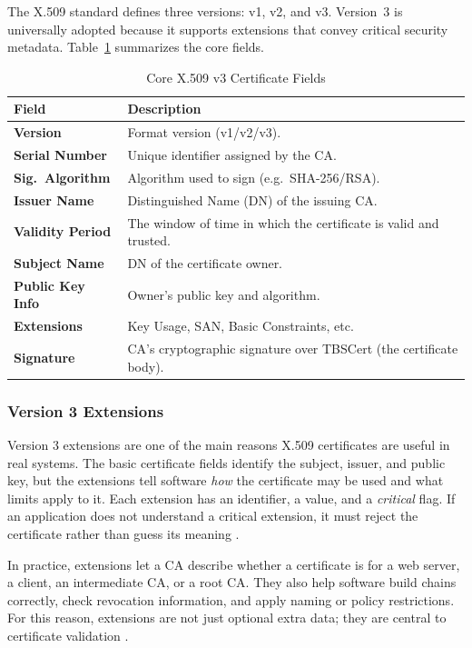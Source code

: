 \documentclass[10pt,twocolumn]{article}
\begin{document}
The X.509 standard defines three versions: v1, v2, and v3. Version~3 is
universally adopted because it supports extensions that convey critical
security metadata. Table~\ref{tab:cert-fields} summarizes the core fields.

\begin{table}[h]
\centering
\caption{Core X.509 v3 Certificate Fields}
\label{tab:cert-fields}
\renewcommand{\arraystretch}{1.2}
\begin{tabularx}{\columnwidth}{>{\bfseries\footnotesize}p{2.1cm}
                                >{\footnotesize}X}
\toprule
Field & Description \\
\midrule
Version        & Format version (v1/v2/v3). \\
Serial Number  & Unique identifier assigned by the CA. \\
Sig.\ Algorithm& Algorithm used to sign (e.g.\ SHA-256/RSA). \\
Issuer Name    & Distinguished Name (DN) of the issuing CA. \\
Validity Period& The window of time in which the certificate is valid and trusted. \\
Subject Name   & DN of the certificate owner. \\
Public Key Info& Owner's public key and algorithm. \\
Extensions     & Key Usage, SAN, Basic Constraints, etc. \\
Signature      & CA's cryptographic signature over TBSCert (the certificate body). \\
\bottomrule
\end{tabularx}
\end{table}

\subsubsection{Version 3 Extensions}

Version 3 extensions are one of the main reasons X.509 certificates are useful
in real systems. The basic certificate fields identify the subject, issuer,
and public key, but the extensions tell software \emph{how} the certificate
may be used and what limits apply to it. Each extension has an identifier, a
value, and a \emph{critical} flag. If an application does not understand a
critical extension, it must reject the certificate rather than guess its
meaning \cite{rfc5280}.

In practice, extensions let a CA describe whether a certificate is for a web
server, a client, an intermediate CA, or a root CA. They also help software
build chains correctly, check revocation information, and apply naming or
policy restrictions. For this reason, extensions are not just optional extra
data; they are central to certificate validation \cite{rfc5280}.
\end{document}
